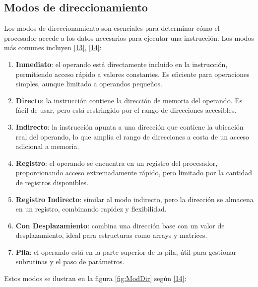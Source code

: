 \documentclass[12pt,oneside]{templates/unerthesis}
\providecommand{\tightlist}{%
  \setlength{\itemsep}{0pt}\setlength{\parskip}{0pt}}
\begin{document}
\hypertarget{modos-de-direccionamiento}{%
\subsection{Modos de direccionamiento}\label{modos-de-direccionamiento}}

Los modos de direccionamiento son esenciales para determinar cómo el procesador accede a los datos necesarios para ejecutar una instrucción. Los modos más comunes incluyen \protect\hyperlink{ref-hennessy_computer_2012}{{[}13{]}}, \protect\hyperlink{ref-stallings_computer_2013}{{[}14{]}}:

\begin{enumerate}
\def\labelenumi{\alph{enumi})}
\tightlist
\item
  \textbf{Inmediato}: el operando está directamente incluido en la instrucción, permitiendo acceso rápido a valores constantes. Es eficiente para operaciones simples, aunque limitado a operandos pequeños.
\item
  \textbf{Directo}: la instrucción contiene la dirección de memoria del operando. Es fácil de usar, pero está restringido por el rango de direcciones accesibles.
\item
  \textbf{Indirecto}: la instrucción apunta a una dirección que contiene la ubicación real del operando, lo que amplía el rango de direcciones a costa de un acceso adicional a memoria.
\item
  \textbf{Registro}: el operando se encuentra en un registro del procesador, proporcionando acceso extremadamente rápido, pero limitado por la cantidad de registros disponibles.
\item
  \textbf{Registro Indirecto}: similar al modo indirecto, pero la dirección se almacena en un registro, combinando rapidez y flexibilidad.
\item
  \textbf{Con Desplazamiento}: combina una dirección base con un valor de desplazamiento, ideal para estructuras como arrays y matrices.
\item
  \textbf{Pila}: el operando está en la parte superior de la pila, útil para gestionar subrutinas y el paso de parámetros.
\end{enumerate}

Estos modos se ilustran en la figura \ref{fig:ModDir} según \protect\hyperlink{ref-stallings_computer_2013}{{[}14{]}}:
\end{document}
